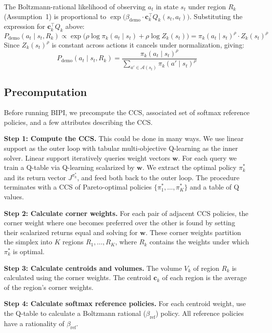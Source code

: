\documentclass[11pt]{article}
\begin{document}
The Boltzmann-rational likelihood of observing $a_t$ in state $s_t$ under region $R_k$ (Assumption~1) is proportional to $\exp\!\big(\beta_{\text{demo}} \cdot \mathbf{c}_k^\top Q_k(s_t, a_t)\big)$. Substituting the expression for $\mathbf{c}_k^\top Q_k$ above:
\begin{equation}
    P_{\text{demo}}(a_t \mid s_t, R_k) \propto \exp\!\big(\rho \log \pi_k(a_t \mid s_t) + \rho \log Z_k(s_t)\big) = \pi_k(a_t \mid s_t)^{\rho} \cdot Z_k(s_t)^{\rho}
\end{equation}
Since $Z_k(s_t)^{\rho}$ is constant across actions it cancels under normalization, giving:
\begin{equation}
    P_{\text{demo}}(a_t \mid s_t, R_k) = \frac{\pi_k(a_t \mid s_t)^{\rho}}{\displaystyle\sum_{a' \in \mathcal{A}(s_t)} \pi_k(a' \mid s_t)^{\rho}}
\end{equation}


\subsection{Precomputation}

Before running BIPI, we precompute the CCS, associated set of softmax reference policies, and a few attributes describing the CCS.

\textbf{Step 1: Compute the CCS.} This could be done in many ways. We use linear support \cite{felten2023} as the outer loop with tabular multi-objective Q-learning as the inner solver. Linear support iteratively queries weight vectors $\mathbf{w}$. For each query we train a Q-table via Q-learning scalarized by $\mathbf{w}$. We extract the optimal policy $\pi^*_k$ and its return vector $J^{\pi^*_k}$, and feed both back to the outer loop. The procedure terminates with a CCS of Pareto-optimal policies $\{\pi^*_1, \ldots, \pi^*_K\}$ and a table of Q values.

\textbf{Step 2: Calculate corner weights.} For each pair of adjacent CCS policies, the corner weight where one becomes preferred over the other is found by setting their scalarized returns equal and solving for $\mathbf{w}$. These corner weights partition the simplex into $K$ regions $R_1, \ldots, R_K$, where $R_k$ contains the weights under which $\pi^*_k$ is optimal.

\textbf{Step 3: Calculate centroids and volumes.} The volume $V_k$ of region $R_k$ is calculated using the corner weights. The centroid $\mathbf{c}_k$ of each region is the average of the region's corner weights.

\textbf{Step 4: Calculate softmax reference policies.} For each centroid weight, use the Q-table to calculate a Boltzmann rational ($\beta_{\text{ref}}$) policy. All reference policies have a rationality of $\beta_{\text{ref}}$.
\end{document}
